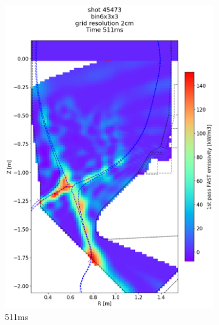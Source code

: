 \begin{figure}
\begin{subfigure}{0.355\linewidth}
         \includegraphics[trim={75 70 25 190},clip,width=\textwidth]{Chapters/chapter2/figs/IRVB-MASTU_shot-45473_export_68.png}
         \vspace*{-6.5mm}
         \caption{511ms}
         \label{fig:45473_export2_2}
     \end{subfigure}
     \begin{subfigure}{0.355\linewidth}
         \centering

\end{subfigure}
\end{figure}
